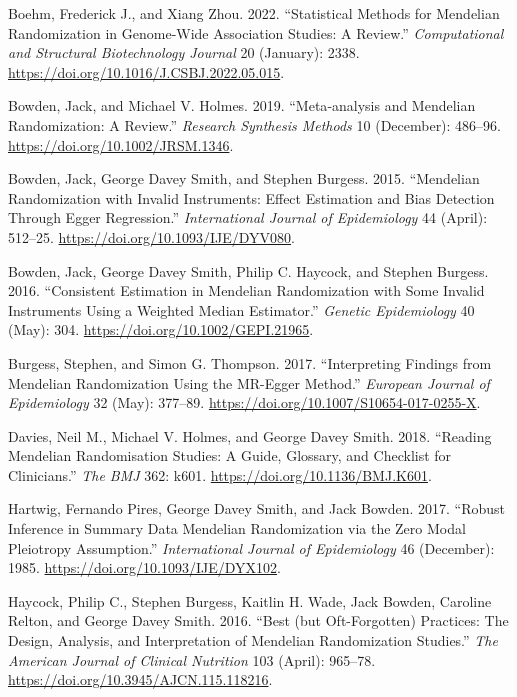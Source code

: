 \documentclass[
]{article}
\newlength{\cslhangindent}
\newenvironment{CSLReferences}[2] %
 {\begin{list}{}{%
  \setlength{\itemindent}{0pt}
  \setlength{\leftmargin}{0pt}
  \setlength{\parsep}{0pt}
  \ifodd #1
   \setlength{\leftmargin}{\cslhangindent}
   \setlength{\itemindent}{-1\cslhangindent}
  \fi
  \setlength{\itemsep}{#2\baselineskip}}}
 {\end{list}}
\begin{document}
\label{refs}
\begin{CSLReferences}{1}{0}
Boehm, Frederick J., and Xiang Zhou. 2022. {``Statistical Methods for
Mendelian Randomization in Genome-Wide Association Studies: A Review.''}
\emph{Computational and Structural Biotechnology Journal} 20 (January):
2338. \url{https://doi.org/10.1016/J.CSBJ.2022.05.015}.

Bowden, Jack, and Michael V. Holmes. 2019. {``Meta‐analysis and
Mendelian Randomization: A Review.''} \emph{Research Synthesis Methods}
10 (December): 486--96. \url{https://doi.org/10.1002/JRSM.1346}.

Bowden, Jack, George Davey Smith, and Stephen Burgess. 2015.
{``Mendelian Randomization with Invalid Instruments: Effect Estimation
and Bias Detection Through Egger Regression.''} \emph{International
Journal of Epidemiology} 44 (April): 512--25.
\url{https://doi.org/10.1093/IJE/DYV080}.

Bowden, Jack, George Davey Smith, Philip C. Haycock, and Stephen
Burgess. 2016. {``Consistent Estimation in Mendelian Randomization with
Some Invalid Instruments Using a Weighted Median Estimator.''}
\emph{Genetic Epidemiology} 40 (May): 304.
\url{https://doi.org/10.1002/GEPI.21965}.

Burgess, Stephen, and Simon G. Thompson. 2017. {``Interpreting Findings
from Mendelian Randomization Using the MR-Egger Method.''}
\emph{European Journal of Epidemiology} 32 (May): 377--89.
\url{https://doi.org/10.1007/S10654-017-0255-X}.

Davies, Neil M., Michael V. Holmes, and George Davey Smith. 2018.
{``Reading Mendelian Randomisation Studies: A Guide, Glossary, and
Checklist for Clinicians.''} \emph{The BMJ} 362: k601.
\url{https://doi.org/10.1136/BMJ.K601}.

Hartwig, Fernando Pires, George Davey Smith, and Jack Bowden. 2017.
{``Robust Inference in Summary Data Mendelian Randomization via the Zero
Modal Pleiotropy Assumption.''} \emph{International Journal of
Epidemiology} 46 (December): 1985.
\url{https://doi.org/10.1093/IJE/DYX102}.

Haycock, Philip C., Stephen Burgess, Kaitlin H. Wade, Jack Bowden,
Caroline Relton, and George Davey Smith. 2016. {``Best (but
Oft-Forgotten) Practices: The Design, Analysis, and Interpretation of
Mendelian Randomization Studies.''} \emph{The American Journal of
Clinical Nutrition} 103 (April): 965--78.
\url{https://doi.org/10.3945/AJCN.115.118216}.


\end{CSLReferences}
\end{document}
